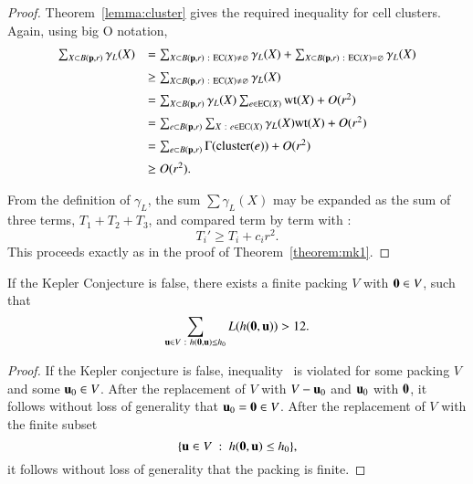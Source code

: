 \begin{proof}
Theorem~\ref{lemma:cluster} gives the required inequality for cell clusters.
Again, using big O notation, 
$$
\begin{array}{lll}
\sum_{X\subset B(\p,r)} \gamma_L(X) &= 
\sum_{X\subset B(\p,r)\mid \op{EC}(X)\ne\emptyset} \gamma_L(X) +
\sum_{X\subset B(\p,r)\mid \op{EC}(X)=\emptyset} \gamma_L(X) \vspace{6pt}\\
&\ge \sum_{X\subset B(\p,r)\mid \op{EC}(X)\ne\emptyset} \gamma_L(X)\vspace{6pt} \\
&=\sum_{X\subset B(\p,r)}\gamma_L(X)\sum_{e \in \op{EC}(X)}\op{wt}(X) + O(r^2)\vspace{6pt}\\
&=\sum_{e\subset B(\p,r)}\sum_{X\mid e \in \op{EC}(X)}\gamma_L(X)\op{wt}(X) + O(r^2)\vspace{6pt}\\
&=\sum_{e\subset B(\p,r)}\Gamma(\op{cluster}(e)) + O(r^2)\vspace{6pt}\\
&\ge O(r^2).
\end{array}
$$

From the definition of $\gamma_L$, the sum $\sum \gamma_L(X)$ may be expanded as the sum of three terms, $T_1+T_2+T_3$, and compared term by term with :
$$
T_i' \ge T_i + c_i r^2.
$$
This proceeds exactly as in the proof of Theorem~\ref{theorem:mk1}.
\end{proof}

\begin{corollary}\label{cor:CE} If the Kepler Conjecture is false,
there exists a finite packing $ V$ with ${\mathbf 0}\in V$, such
that
\begin{equation}\label{eqn:CE}
\sum_{ {\mathbf u}\in V \ :\  h({\mathbf 0}, {\mathbf u})\le h_0} L(h({\mathbf 0}, {\mathbf u})) > 12.
\end{equation}
\end{corollary}

\begin{proof} If the Kepler conjecture is false, inequality~ is violated for some packing $ V$ and some $ {\mathbf u}_0\in V$.  After the replacement of $ V$ with $ V -  {\mathbf u}_0$ and $ {\mathbf u}_0$ with ${\mathbf 0}$, it follows without loss of generality that $ {\mathbf u}_0={\mathbf 0}\in V$.  After the replacement of $ V$ with the finite subset
$$
\{ {\mathbf u}\in V\ :\  h({\mathbf 0}, {\mathbf u})\le h_0\},
$$
it follows without loss of generality that the packing is finite.
\end{proof}


